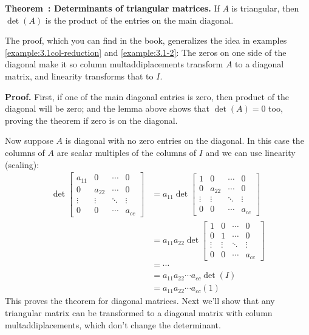 \documentclass[11pt, letterpaper]{report}
\newenvironment{notes}{}{}
\newenvironment{book}{}{}
\newcounter{example}[section]
\newcounter{theorem}[chapter]
\newenvironment{theorem}[1][]{\refstepcounter{theorem}\begin{bbox}\par
    \noindent\textbf{Theorem~\thetheorem: #1}}{\end{bbox}}
\newlength\oldfboxsep%
\newlength\myminiwidth%
\newenvironment{bbox}{%
  \setlength\oldfboxsep\fboxsep
  \setlength{\fboxsep}{.1in}%
  \setlength\myminiwidth\linewidth%
  \addtolength\myminiwidth{-0.2in}%
  \vspace{0.1in}%
  \begin{lrbox}{\bboxbox}\begin{minipage}{\myminiwidth}%
    }{%
    \end{minipage}\end{lrbox}%
  \noindent\fbox{\usebox{\bboxbox}}\vspace{0.1in}\setlength\fboxsep\oldfboxsep%
}
\begin{document}
\begin{theorem}[Determinants of triangular matrices.]  
\label{theorem:det-of-triangular}
If $A$ is triangular, then $\det(A)$ is the product of the entries on the main diagonal.
\end{theorem}

\begin{notes}
The proof, which you can find in the book, generalizes the idea in examples \ref{example:3.1col-reduction} and \ref{example:3.1-2}: The zeros on one side of the diagonal make it so column multaddiplacements transform $A$ to a diagonal matrix, and linearity transforms that to $I$.
\end{notes}

\begin{book}
\textbf{Proof.} First, if one of the main diagonal entries is zero, then product of the diagonal will be zero; and the lemma above shows that $\det(A)=0$ too, proving the theorem if zero is on the diagonal.

Now suppose $A$ is diagonal with no zero entries on the diagonal. In this case the columns of $A$ are scalar multiples of the columns of $I$ and we can use linearity (scaling):
\begin{align*}
\det\begin{bmatrix}
a_{11} & 0 & \cdots & 0 \\
0 & a_{22} & \cdots & 0 \\
\vdots & \vdots & \ddots & \vdots \\
0 & 0 & \cdots & a_{cc}
\end{bmatrix} &= a_{11}\det\begin{bmatrix}
1 & 0 & \cdots & 0 \\
0 & a_{22} & \cdots & 0 \\
\vdots & \vdots & \ddots & \vdots \\
0 & 0 & \cdots & a_{cc}
\end{bmatrix}\\
&= a_{11}a_{22}\det\begin{bmatrix}
1 & 0 & \cdots & 0 \\
0 & 1 & \cdots & 0 \\
\vdots & \vdots & \ddots & \vdots \\
0 & 0 & \cdots & a_{cc}
\end{bmatrix}\\ 
&= \cdots \\ 
&= a_{11}a_{22} \cdots a_{cc}\det(I) \\ 
&= a_{11}a_{22} \cdots a_{cc}(1)
\end{align*}
This proves the theorem for diagonal matrices. Next we'll show that any triangular matrix can be transformed to a diagonal matrix with column multaddiplacements, which don't change the determinant.


\end{book}
\end{document}
